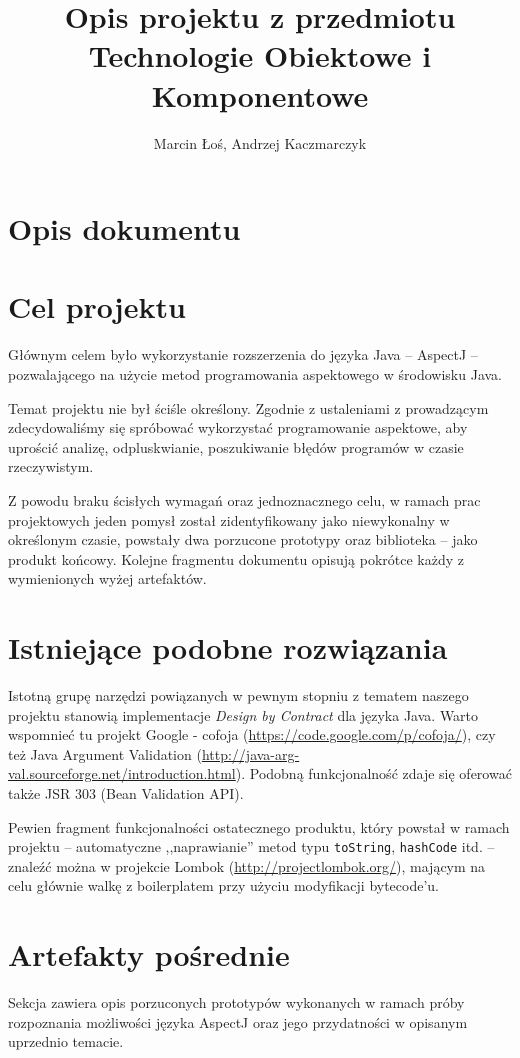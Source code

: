 \documentclass[12pt,a4paper,titlepage]{article}
\title{Opis projektu z przedmiotu Technologie Obiektowe i Komponentowe}
\author{Marcin Łoś, Andrzej Kaczmarczyk}
\begin{document}
\maketitle
\pagestyle{empty}
\pagestyle{headings}

\section{Opis dokumentu}
 
\section{Cel projektu}
 Głównym celem było wykorzystanie rozszerzenia do języka Java -- AspectJ -- pozwalającego na użycie metod programowania aspektowego w środowisku Java.
 
 Temat projektu nie był ściśle określony. Zgodnie z ustaleniami z prowadzącym zdecydowaliśmy się spróbować wykorzystać programowanie aspektowe, aby uprościć analizę, odpluskwianie, poszukiwanie błędów programów w czasie rzeczywistym.
 
 Z powodu braku ścisłych wymagań oraz jednoznacznego celu, w ramach prac projektowych jeden pomysł został zidentyfikowany jako niewykonalny w określonym czasie, powstały dwa porzucone prototypy oraz biblioteka -- jako produkt końcowy. Kolejne fragmentu dokumentu opisują pokrótce każdy z wymienionych wyżej artefaktów.
 
\section{Istniejące podobne rozwiązania}
Istotną grupę narzędzi powiązanych w pewnym stopniu z tematem naszego projektu stanowią implementacje \emph{Design by Contract} dla języka Java. Warto wspomnieć tu projekt Google - cofoja (\url{https://code.google.com/p/cofoja/}), czy też Java Argument Validation (\url{http://java-arg-val.sourceforge.net/introduction.html}). Podobną funkcjonalność zdaje się oferować także JSR 303 (Bean Validation API).

Pewien fragment funkcjonalności ostatecznego produktu, który powstał w ramach projektu -- automatyczne ,,naprawianie'' metod typu \texttt{toString}, \texttt{hashCode} itd. -- znaleźć można w projekcie Lombok (\url{http://projectlombok.org/}), mającym na celu głównie walkę z boilerplatem przy użyciu modyfikacji bytecode'u.

\section{Artefakty pośrednie}
 Sekcja zawiera opis porzuconych prototypów wykonanych w ramach próby rozpoznania możliwości języka AspectJ oraz jego przydatności w opisanym uprzednio temacie.
\end{document}
